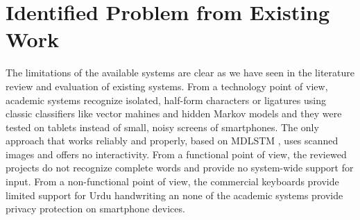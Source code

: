 \documentclass[12pt,a4paper]{report}
\begin{document}
\section{Identified Problem from Existing Work}
The limitations of the available systems are clear as we have seen in the literature review and evaluation of existing systems. From a technology point of view, academic systems recognize isolated, half-form characters or ligatures using classic classifiers like vector mahines and hidden Markov models and they were tested on tablets instead of small, noisy screens of smartphones. The only approach that works reliably and properly, based on MDLSTM \cite{naz2014}, uses scanned images and offers no interactivity. From a functional point of view, the reviewed projects do not recognize complete words and provide no system-wide support for input. From a non-functional point of view, the commercial keyboards provide limited support for Urdu handwriting an none of the academic systems provide privacy protection on smartphone devices.
\end{document}
